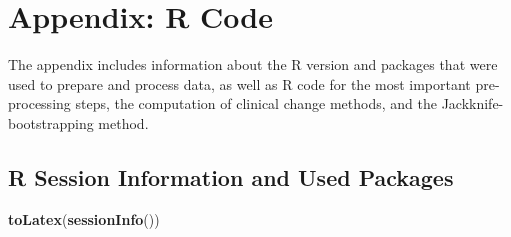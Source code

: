 \documentclass[12pt,twoside]{reedthesis}
\newenvironment{Shaded}{\begin{snugshade}}{\end{snugshade}}
\newcommand{\KeywordTok}[1]{\textcolor[rgb]{0.13,0.29,0.53}{\textbf{#1}}}
\newcommand{\NormalTok}[1]{#1}
\begin{document}
\appendix

\setlength{\parindent}{0in}
\setlength{\leftskip}{0in}
\setlength{\parskip}{0pt}

\hypertarget{appendix-r-code}{%
\chapter*{Appendix: R Code}\label{appendix-r-code}}

The appendix includes information about the R version and packages that were used to prepare and process data, as well as R code for the most important pre-processing steps, the computation of clinical change methods, and the Jackknife-bootstrapping method.

\hypertarget{session-info}{%
\section{R Session Information and Used Packages}\label{session-info}}
\begin{Shaded}
\begin{Highlighting}[]
\KeywordTok{toLatex}\NormalTok{(}\KeywordTok{sessionInfo}\NormalTok{())}
\end{Highlighting}
\end{Shaded}
\end{document}
